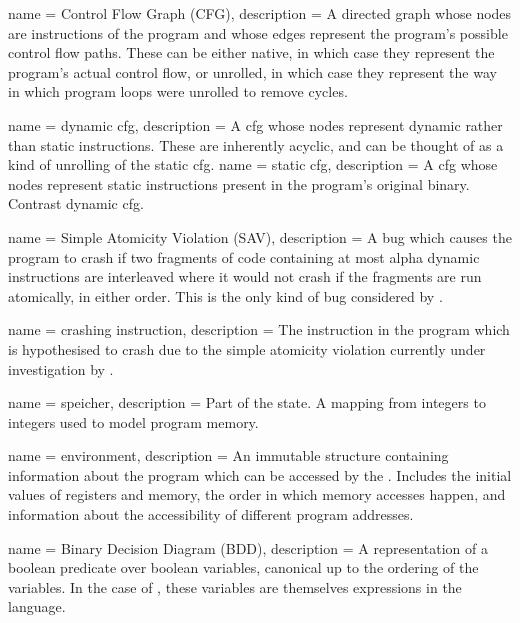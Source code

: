 {
  name = Control Flow Graph (CFG),
  description = {A directed graph whose nodes are instructions
    of the program and whose edges represent the program's possible
    control flow paths.  These can be either native, in which
    case they represent the program's actual control flow, or
    unrolled, in which case they represent the way in which program
    loops were unrolled to remove cycles.
  }
}

{
  name = {dynamic \gls{cfg}},
  description = {A \gls{cfg} whose nodes represent dynamic rather than
    static instructions.  These are inherently acyclic, and can be thought
    of as a kind of unrolling of the \gls{static cfg}.}
}
{
  name = {static \gls{cfg}},
  description = {A \gls{cfg} whose nodes represent static instructions
    present in the program's original binary.  Contrast \gls{dynamic cfg}.}
}

{
  name = Simple Atomicity Violation (SAV),
  description = {A bug which causes the program to crash if two fragments of
    code containing at most \gls{alpha} dynamic instructions are interleaved where
    it would not crash if the fragments are run atomically, in either order.
    This is the only kind of bug considered by {\technique}.}
}

{
  name = {crashing instruction},
  description = {The instruction in the program which is hypothesised to crash
    due to the \gls{simple atomicity violation} currently under investigation by
    {\technique}.}
}

 { name = {speicher}, description = {Part
    of the {\StateMachine} state.  A mapping from integers to integers
    used to model program memory.} }

 { name = {environment}, description =
  {An immutable structure containing information about the program
    which can be accessed by the {\StateMachine}.  Includes the
    initial values of registers and memory, the order in which memory
    accesses happen, and information about the accessibility of
    different program addresses. }}

{
  name = Binary Decision Diagram (BDD),
  description = {A representation of a boolean predicate over boolean
    variables, canonical up to the ordering of the variables.  In the
    case of {\technique}, these variables are themselves expressions in
    the {\StateMachine} language.}
}

